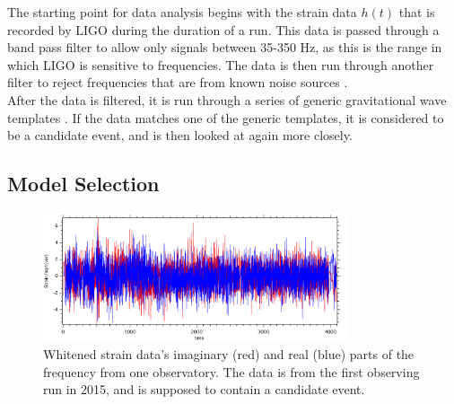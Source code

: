 \documentclass{article}
\begin{document}
The starting point for data analysis begins with the strain data $h(t)$ that is recorded by LIGO during the duration of a run. This data is passed through a band pass filter to allow only signals between 35-350 Hz, as this is the range in which LIGO is sensitive to frequencies. The data is then run through another filter to reject frequencies that are from known noise sources \cite{ligo2016properties}. \\


After the data is filtered, it is run through a series of generic gravitational wave templates \cite{abbott2016observing}. If the data matches one of the generic templates, it is considered to be a candidate event, and is then looked at again more closely. \\


 
 \subsection{Model Selection}

   \begin{figure}[h]
   	\centering
   	\includegraphics[width=0.8\textwidth]{Figures/strainData.pdf}
   	\caption{Whitened strain data's imaginary (red) and real (blue) parts of the frequency from one observatory. The data is from the first observing run in 2015, and is supposed to contain a candidate event.}
   	\label{Fig:strainData}
   \end{figure}
   
\end{document}
